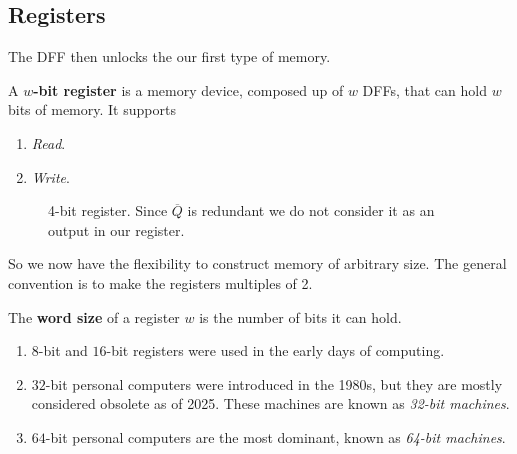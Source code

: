 \subsection{Registers}

  The DFF then unlocks the our first type of memory. 

  \begin{definition}[Register]
    A \textbf{$w$-bit register} is a memory device, composed up of $w$ DFFs, that can hold $w$ bits of memory. It supports 
    \begin{enumerate}
      \item \textit{Read}. 
      \item \textit{Write}. 
    \end{enumerate}

    \begin{figure}[H]
      \centering 
      \caption{4-bit register. Since $\overline{Q}$ is redundant we do not consider it as an output in our register. } 
    \end{figure}
  \end{definition}

  So we now have the flexibility to construct memory of arbitrary size. The general convention is to make the registers multiples of 2. 

  \begin{definition}[Word]
    The \textbf{word size} of a register $w$ is the number of bits it can hold. 
    \begin{enumerate}
      \item $8$-bit and $16$-bit registers were used in the early days of computing. 
      \item $32$-bit personal computers were introduced in the 1980s, but they are mostly considered obsolete as of 2025. These machines are known as \textit{32-bit machines}. 
      \item $64$-bit personal computers are the most dominant, known as \textit{64-bit machines}. 
    \end{enumerate}
  \end{definition} 

